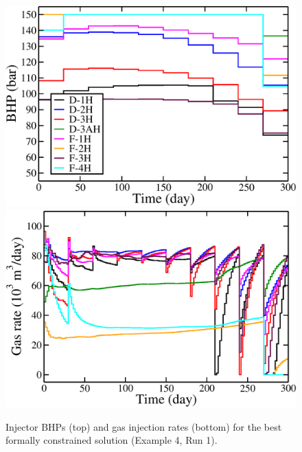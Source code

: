 \documentclass[twocolumn,numbook]{svjour3}          %
\begin{document}
\begin{figure}
\begin{center}
\includegraphics[totalheight=2.2in,angle=0]{norneConstrainedIlPlT300_BHP.pdf}
\includegraphics[totalheight=2.2in,angle=0]{norneConstrainedIlPlT300_rate_gas.pdf}
\end{center}
\caption{Injector BHPs (top) and gas injection rates (bottom) for the best formally constrained solution (Example 4, Run 1).}
\label{fig:NorneConstrainedOptimalRates}
\end{figure}
\end{document}
